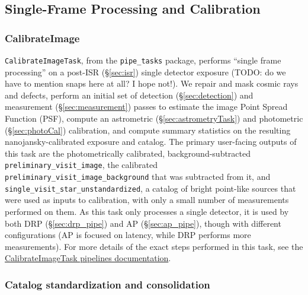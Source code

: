 \subsection{Single-Frame Processing and Calibration}

\subsubsection{CalibrateImage}
\label{sec:CalibrateImage}

\texttt{CalibrateImageTask}, from the \texttt{pipe\_tasks} package, performs ``single frame processing'' on a post-ISR (\S\ref{sec:isr}) single detector exposure (TODO: do we have to mention snaps here at all? I hope not!).
We repair and mask cosmic rays and defects, perform an initial set of detection (\S\ref{sec:detection}) and measurement (\S\ref{sec:measurement}) passes to estimate the image Point Spread Function (PSF), compute an astrometric (\S\ref{sec:astrometryTask}) and photometric (\S\ref{sec:photoCal}) calibration, and compute summary statistics on the resulting nanojansky-calibrated exposure and catalog.
The primary user-facing outputs of this task are the photometrically calibrated, background-subtracted \texttt{preliminary\_visit\_image}, the calibrated \texttt{preliminary\_visit\_image\_background} that was subtracted from it, and \texttt{single\_visit\_star\_unstandardized}, a catalog of bright point-like sources that were used as inputs to calibration, with only a small number of measurements performed on them.
As this task only processes a single detector, it is used by both DRP (\S\ref{sec:drp_pipe}) and AP (\S\ref{sec:ap_pipe}), though with different configurations (AP is focused on latency, while DRP performs more measurements).
For more details of the exact steps performed in this task, see the \href{https://pipelines.lsst.io/v/daily/modules/lsst.pipe.tasks/tasks/lsst.pipe.tasks.calibrateImage.CalibrateImageTask.html}{CalibrateImageTask pipelines documentation}.

\subsubsection{Catalog standardization and consolidation}
\label{sec:StandardizeAndConsolidate}

